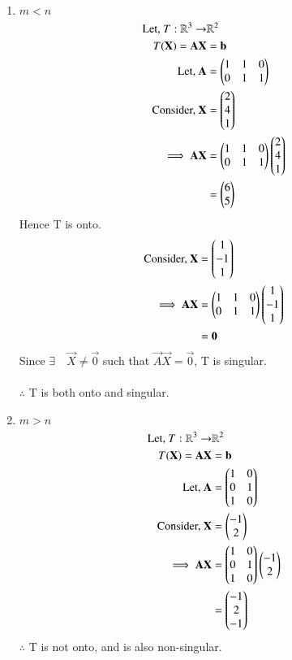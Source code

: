 \begin{enumerate}
\item {$m<n$}
\begin{align}
	\text{Let, }T:\mathbb{R}^3 \rightarrow &\mathbb{R}^2\\
	T(\mathbf{X}) = \mathbf{A}\mathbf{X} &= \mathbf{b}\\
	\text{Let, }\mathbf{A} &= \begin{pmatrix}1 & 1 & 0\\0 & 1 & 1\end{pmatrix}\\
	\text{Consider, }\mathbf{X} &= \begin{pmatrix}2\\4\\1\end{pmatrix}\\
	\implies \mathbf{A}\mathbf{X} &= \begin{pmatrix}1 & 1 & 0\\0 & 1 & 1\end{pmatrix}\begin{pmatrix}2\\4\\1\end{pmatrix}\\
	&= \begin{pmatrix}6\\5\end{pmatrix}
\end{align}
Hence T is onto.
\begin{align}
	\text{Consider, } \mathbf{X} &= \begin{pmatrix}1\\-1\\1\end{pmatrix}\\
	\implies \mathbf{A}\mathbf{X} &= \begin{pmatrix}1 & 1 & 0\\0 & 1 & 1\end{pmatrix}\begin{pmatrix}1\\-1\\1\end{pmatrix}\\
	&= \mathbf{0}
\end{align}
Since $\exists \quad \vec{X} \neq \vec{0}$ such that $\vec{A}\vec{X} = \vec{0}$, T is singular.\\
\\
$\therefore$ T is both onto and singular.
\item {$m>n$}
\begin{align}
	\text{Let, }T:\mathbb{R}^3 \rightarrow &\mathbb{R}^2\\
	T(\mathbf{X}) = \mathbf{A}\mathbf{X} &= \mathbf{b}\\
	\text{Let, }\mathbf{A} &= \begin{pmatrix}1 & 0\\0 & 1\\1 & 0\end{pmatrix}\\
	\text{Consider, }\mathbf{X} &= \begin{pmatrix}-1\\2\end{pmatrix}\\
	\implies \mathbf{A}\mathbf{X} &= \begin{pmatrix}1 & 0\\0 & 1\\1 & 0\end{pmatrix}\begin{pmatrix}-1\\2\end{pmatrix}\\
	&= \begin{pmatrix}-1\\2\\-1\end{pmatrix}\\
\end{align}
$\therefore$ T is not onto, and is also non-singular.
\end{enumerate}

